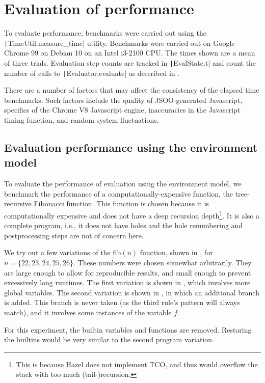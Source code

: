 \chapter{Evaluation of performance}
\label{sec:evaluation}

To evaluate performance, benchmarks were carried out using the \texttt|TimeUtil.measure_time| utility. Benchmarks were carried out on Google Chrome 99 on Debian 10 on an Intel i3-2100 CPU. The times shown are a mean of three trials. Evaluation step counts are tracked in \texttt|EvalState.t| and count the number of calls to \texttt|Evaluator.evaluate| as described in .

There are a number of factors that may affect the consistency of the elapsed time benchmarks. Such factors include the quality of JSOO-generated Javascript, specifics of the Chrome V8 Javascript engine, inaccuracies in the Javascript timing function, and random system fluctuations.

\section{Evaluation performance using the environment model}
\label{sec:evaluation-evalenv}

To evaluate the performance of evaluation using the environment model, we benchmark the performance of a computationally-expensive function, the tree-recursive Fibonacci function. This function is chosen because it is computationally expensive and does not have a deep recursion depth\footnote{This is because Hazel does not implement TCO, and thus would overflow the stack with too much (tail-)recursion.}. It is also a complete program, i.e., it does not have holes and the hole renumbering and postprocessing steps are not of concern here.

We try out a few variations of the $\text{fib}(n)$ function, shown in , for $n=\{22,23,24,25,26\}$. These numbers were chosen somewhat arbitrarily. They are large enough to allow for reproducible results, and small enough to prevent excessively long runtimes. The first variation is shown in , which involves more global variables. The second variation is shown in , in which an additional branch is added. This branch is never taken (as the third rule's pattern will always match), and it involves some instances of the variable $f$.

For this experiment, the builtin variables and functions are removed. Restoring the builtins would be very similar to the second program variation.

